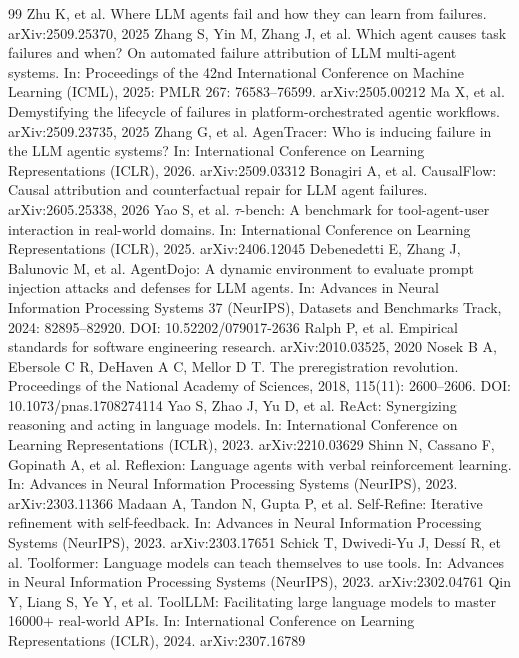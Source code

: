 \documentclass[10pt]{article}
\begin{document}
\begin{thebibliography}{99}
 Zhu K, et al. Where LLM agents fail and how they can learn from failures. arXiv:2509.25370, 2025
 Zhang S, Yin M, Zhang J, et al. Which agent causes task failures and when? On automated failure attribution of LLM multi-agent systems. In: Proceedings of the 42nd International Conference on Machine Learning (ICML), 2025: PMLR 267: 76583--76599. arXiv:2505.00212
 Ma X, et al. Demystifying the lifecycle of failures in platform-orchestrated agentic workflows. arXiv:2509.23735, 2025
 Zhang G, et al. AgenTracer: Who is inducing failure in the LLM agentic systems? In: International Conference on Learning Representations (ICLR), 2026. arXiv:2509.03312
 Bonagiri A, et al. CausalFlow: Causal attribution and counterfactual repair for LLM agent failures. arXiv:2605.25338, 2026
 Yao S, et al. $\tau$-bench: A benchmark for tool-agent-user interaction in real-world domains. In: International Conference on Learning Representations (ICLR), 2025. arXiv:2406.12045
 Debenedetti E, Zhang J, Balunovic M, et al. AgentDojo: A dynamic environment to evaluate prompt injection attacks and defenses for LLM agents. In: Advances in Neural Information Processing Systems 37 (NeurIPS), Datasets and Benchmarks Track, 2024: 82895--82920. DOI: 10.52202/079017-2636
 Ralph P, et al. Empirical standards for software engineering research. arXiv:2010.03525, 2020
 Nosek B A, Ebersole C R, DeHaven A C, Mellor D T. The preregistration revolution. Proceedings of the National Academy of Sciences, 2018, 115(11): 2600--2606. DOI: 10.1073/pnas.1708274114
 Yao S, Zhao J, Yu D, et al. ReAct: Synergizing reasoning and acting in language models. In: International Conference on Learning Representations (ICLR), 2023. arXiv:2210.03629
 Shinn N, Cassano F, Gopinath A, et al. Reflexion: Language agents with verbal reinforcement learning. In: Advances in Neural Information Processing Systems (NeurIPS), 2023. arXiv:2303.11366
 Madaan A, Tandon N, Gupta P, et al. Self-Refine: Iterative refinement with self-feedback. In: Advances in Neural Information Processing Systems (NeurIPS), 2023. arXiv:2303.17651
 Schick T, Dwivedi-Yu J, Dess\'i R, et al. Toolformer: Language models can teach themselves to use tools. In: Advances in Neural Information Processing Systems (NeurIPS), 2023. arXiv:2302.04761
 Qin Y, Liang S, Ye Y, et al. ToolLLM: Facilitating large language models to master 16000+ real-world APIs. In: International Conference on Learning Representations (ICLR), 2024. arXiv:2307.16789

\end{thebibliography}
\end{document}
